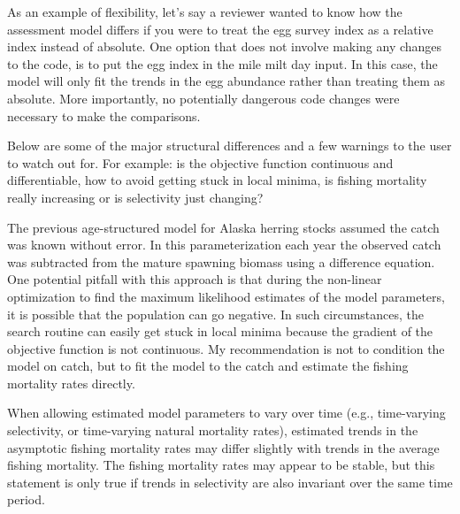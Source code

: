 \documentclass[12pt,letterpaper]{article}
\begin{document}
  As an example of flexibility, let's say a reviewer wanted to know how the assessment model differs if you were to treat the egg survey index as a relative index instead of absolute. One option that does not involve making any changes to the code, is to put the egg index in the mile milt day input.  In this case, the model will only fit the trends in the egg abundance rather than treating them as absolute.  More importantly, no potentially dangerous code changes were necessary to make the comparisons.

  Below are  some of the major structural differences and  a few warnings to the user to watch out for.  For example: is the objective function continuous and differentiable, how to avoid getting stuck in local minima, is fishing mortality really increasing or is selectivity just changing?

  The previous age-structured model for Alaska herring stocks assumed the catch was known without error.  In this parameterization each year the observed catch was subtracted from the mature spawning biomass using a difference equation. One potential pitfall with this approach is that during the non-linear optimization to find the maximum likelihood estimates of the model parameters, it is possible that the population can go negative.  In such circumstances, the search routine can easily get stuck in local minima because the gradient of the objective function is not continuous.  My recommendation is not to condition the model on catch, but to fit the model to the catch and estimate the fishing mortality rates directly.


  When allowing estimated model parameters to vary over time (e.g., time-varying selectivity, or time-varying natural mortality rates), estimated trends in the asymptotic fishing mortality rates may differ slightly with trends in the average fishing mortality.  The fishing mortality rates may appear to be stable, but this statement is only true if trends in selectivity are also invariant over the same time period. 
\end{document}
